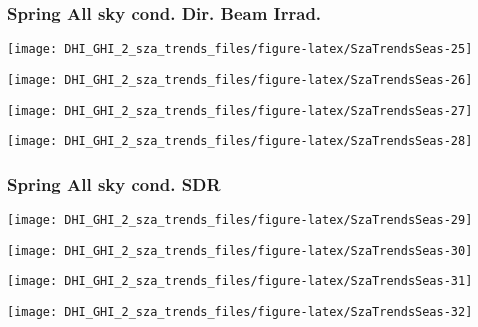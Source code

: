 \documentclass[
  10pt,
  a4paper,oneside]{article}
\begin{document}
\newpage

\hypertarget{spring-all-sky-cond.-dir.-beam-irrad.}{%
\subsubsection{Spring All sky cond. Dir. Beam Irrad.}\label{spring-all-sky-cond.-dir.-beam-irrad.}}

\begin{center}\texttt{[image: DHI\_GHI\_2\_sza\_trends\_files/figure-latex/SzaTrendsSeas-25]} \end{center}

\begin{center}\texttt{[image: DHI\_GHI\_2\_sza\_trends\_files/figure-latex/SzaTrendsSeas-26]} \end{center}

\begin{center}\texttt{[image: DHI\_GHI\_2\_sza\_trends\_files/figure-latex/SzaTrendsSeas-27]} \end{center}

\begin{center}\texttt{[image: DHI\_GHI\_2\_sza\_trends\_files/figure-latex/SzaTrendsSeas-28]} \end{center}

\newpage

\hypertarget{spring-all-sky-cond.-sdr}{%
\subsubsection{Spring All sky cond. SDR}\label{spring-all-sky-cond.-sdr}}

\begin{center}\texttt{[image: DHI\_GHI\_2\_sza\_trends\_files/figure-latex/SzaTrendsSeas-29]} \end{center}

\begin{center}\texttt{[image: DHI\_GHI\_2\_sza\_trends\_files/figure-latex/SzaTrendsSeas-30]} \end{center}

\begin{center}\texttt{[image: DHI\_GHI\_2\_sza\_trends\_files/figure-latex/SzaTrendsSeas-31]} \end{center}

\begin{center}\texttt{[image: DHI\_GHI\_2\_sza\_trends\_files/figure-latex/SzaTrendsSeas-32]} \end{center}
\end{document}
